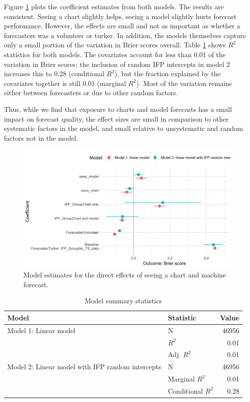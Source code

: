 \documentclass[]{article}
\begin{document}
Figure \ref{fig:model-chart-and-model-effects} plots the coefficient
estimates from both models. The results are consistent. Seeing a chart
slightly helps, seeing a model slightly hurts forecast performance.
However, the effects are small and not as important as whether a
forecasters was a volunteer or turker. In addition, the models
themselves capture only a small portion of the variation in Brier scores
overall. Table \ref{tab:model-summary-stats} shows \(R^2\) statistics
for both models. The covariates account for less than 0.01 of the
variation in Brier scores; the inclusion of random IFP intercepts in
model 2 increases this to 0.28 (conditional \(R^2\)), but the fraction
explained by the covariates together is still 0.01 (marginal \(R^2\)).
Most of the variation remains either between forecasters or due to other
random factors.

Thus, while we find that exposure to charts and model forecasts has a
small impact on forecast quality, the effect sizes are small in
comparison to other systematic factors in the model, and small relative
to unsystematic and random factors not in the model.

\begin{figure}
\caption{\label{fig:model-chart-and-model-effects} Model estimates for the direct effects of seeing a chart and machine forecast.}
\includegraphics{../output/figures/model-chart-and-model-effects.png}
\end{figure}

\begin{table}

\caption{\label{tab:model-summary-stats}Model summary statistics}
\centering
\begin{tabular}[t]{llr}
\toprule
Model & Statistic & Value\\
\midrule
Model 1: Linear model & N & 46956\\
 & $R^2$ & 0.01\\
 & Adj. $R^2$ & 0.01\\
Model 2: Linear model with IFP random intercepts & N & 46956\\
 & Marginal $R^2$ & 0.01\\
 & Conditional $R^2$ & 0.28\\
\bottomrule
\end{tabular}
\end{table}
\end{document}
